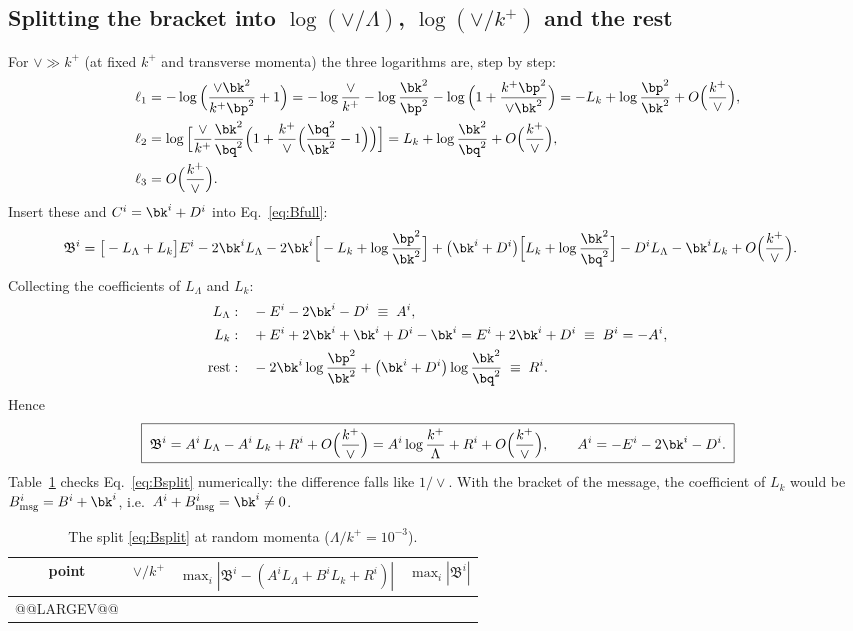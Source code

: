 \subsection{Splitting the bracket into \texorpdfstring{$\log(\vee/\Lambda)$}{log(vee/Lambda)}, \texorpdfstring{$\log(\vee/k^+)$}{log(vee/k+)} and the rest}\label{sec:ft-split}
For $\vee\gg k^+$ (at fixed $k^+$ and transverse momenta) the three logarithms are, step by step:
\begin{align}
\ell_1&=-\log\Big(\frac{\vee\bk^2}{k^+\bp^2}+1\Big)=-\log\frac{\vee}{k^+}-\log\frac{\bk^2}{\bp^2}-\log\Big(1+\frac{k^+\bp^2}{\vee\bk^2}\Big)=-L_k+\log\frac{\bp^2}{\bk^2}+O\Big(\frac{k^+}{\vee}\Big),\notag\\
\ell_2&=\log\Big[\frac{\vee}{k^+}\frac{\bk^2}{\bq^2}\Big(1+\frac{k^+}{\vee}\Big(\frac{\bq^2}{\bk^2}-1\Big)\Big)\Big]=L_k+\log\frac{\bk^2}{\bq^2}+O\Big(\frac{k^+}{\vee}\Big),\notag\\
\ell_3&=O\Big(\frac{k^+}{\vee}\Big).
\end{align}
Insert these and $C^i=\bk^i+D^i$ into Eq.~\eqref{eq:Bfull}:
\begin{align}
\mathfrak B^i={}&\big[-L_\Lambda+L_k\big]E^i-2\bk^iL_\Lambda-2\bk^i\Big[-L_k+\log\frac{\bp^2}{\bk^2}\Big]+\big(\bk^i+D^i\big)\Big[L_k+\log\frac{\bk^2}{\bq^2}\Big]-D^iL_\Lambda-\bk^iL_k+O\Big(\frac{k^+}{\vee}\Big).
\end{align}
Collecting the coefficients of $L_\Lambda$ and $L_k$:
\begin{align}
L_\Lambda:&\quad -E^i-2\bk^i-D^i\;\equiv\;A^i,\notag\\
L_k:&\quad +E^i+2\bk^i+\bk^i+D^i-\bk^i=E^i+2\bk^i+D^i\;\equiv\;B^i=-A^i,\notag\\
\text{rest}:&\quad -2\bk^i\log\frac{\bp^2}{\bk^2}+\big(\bk^i+D^i\big)\log\frac{\bk^2}{\bq^2}\;\equiv\;R^i.
\end{align}
Hence
\begin{equation}
\boxed{\;\mathfrak B^i=A^i\,L_\Lambda-A^i\,L_k+R^i+O\Big(\frac{k^+}{\vee}\Big)=A^i\log\frac{k^+}{\Lambda}+R^i+O\Big(\frac{k^+}{\vee}\Big),\qquad A^i=-E^i-2\bk^i-D^i .\;}
\label{eq:Bsplit}
\end{equation}
Table~\ref{tab:largev} checks Eq.~\eqref{eq:Bsplit} numerically: the difference falls like $1/\vee$. With the bracket of the message, the coefficient of $L_k$ would be $B^i_{\rm msg}=B^i+\bk^i$, i.e.\ $A^i+B^i_{\rm msg}=\bk^i\neq0$.
\begin{table}[H]
\centering\small
\begin{tabular}{@{}c c c c@{}}
point & $\vee/k^+$ & $\max_i|\mathfrak B^i-(A^iL_\Lambda+B^iL_k+R^i)|$ & $\max_i|\mathfrak B^i|$\\ \hline
@@LARGEV@@
\end{tabular}
\caption{The split \eqref{eq:Bsplit} at random momenta ($\Lambda/k^+=10^{-3}$).}
\label{tab:largev}
\end{table}

